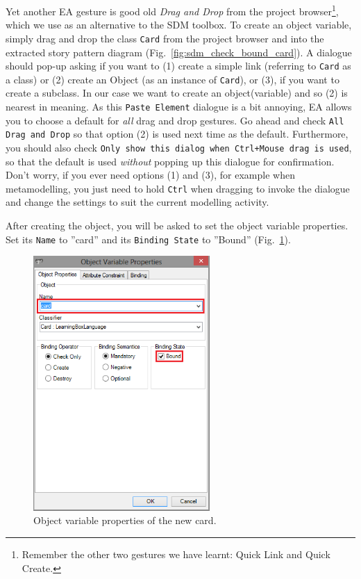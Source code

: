 Yet another EA gesture is good old \emph{Drag and Drop} from the project
browser\footnote{Remember the other two gestures we have learnt:  Quick Link
and Quick Create.}, which we use as an alternative to the SDM toolbox.
To create an object variable, simply drag and drop the class
\texttt{Card} from the project browser and into the extracted story
pattern diagram (Fig.~\ref{fig:sdm_check_bound_card}).  A dialogue should pop-up
asking if you want to (1) create a simple link (referring to \texttt{Card} as a
class) or (2) create an Object (as an instance of \texttt{Card}), or (3), if you
want to create a subclass.  In our case we want to create an object(variable)
and so (2) is nearest in meaning.  As this \texttt{Paste Element} dialogue is a
bit annoying, EA  allows you to choose a default for \emph{all} drag and drop
gestures.  Go ahead and check \texttt{All Drag and Drop} so that option (2) is
used next time as the default.  Furthermore, you should also check
\texttt{Only show this dialog when Ctrl+Mouse drag is used}, so that the
default is used \emph{without} popping up this dialogue for confirmation. Don't worry,
if you ever need options (1) and (3), for example when metamodelling, you  just
need to hold \texttt{Ctrl} when dragging to invoke the dialogue and change  the
settings to suit the current modelling activity.

After creating the object, you will be asked to set the object variable properties. Set its \texttt{Name} to ''card'' and its \texttt{Binding State} to ''Bound'' (Fig.~\ref{fig:sdm_new_card_properties}).

\begin{figure}[htbp]
\begin{center}
  \includegraphics[width=0.6\textwidth]{pics/sdmBilder/check/sdm23.png}
  \caption{Object variable properties of the new card.}
  \label{fig:sdm_new_card_properties}
\end{center}
\end{figure}

